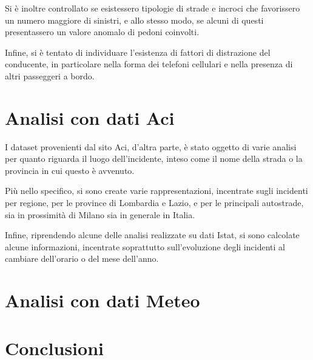 \documentclass[a4paper,12pt]{article}
\begin{document}
Si è inoltre controllato se esistessero tipologie di strade e incroci che favorissero un numero 
maggiore di sinistri, e allo stesso modo, se alcuni di questi presentassero un valore 
anomalo di pedoni coinvolti.

Infine, si è tentato di individuare l'esistenza di fattori di distrazione del 
conducente, in particolare nella forma dei telefoni cellulari e nella presenza 
di altri passeggeri a bordo. 

\section{Analisi con dati Aci}

I dataset provenienti dal sito Aci, d'altra parte, è stato oggetto di varie analisi per 
quanto riguarda il luogo dell'incidente, inteso come il nome della strada o la provincia 
in cui questo è avvenuto. 

Più nello specifico, si sono create varie rappresentazioni, incentrate sugli incidenti 
per regione, per le province di Lombardia e Lazio, e per le principali autostrade, sia in 
prossimità di Milano sia in generale in Italia.

Infine, riprendendo alcune delle analisi realizzate su dati Istat, si sono calcolate alcune 
informazioni, incentrate soprattutto sull'evoluzione degli incidenti al cambiare dell'orario 
o del mese dell'anno.

\section{Analisi con dati Meteo}



\section{Conclusioni}

\printbibliography
\end{document}
